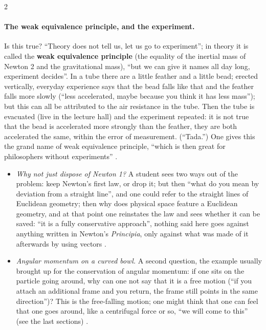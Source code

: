 \begin{paracol}{2}
\paragraph{The weak equivalence principle, and the experiment.} Is this true? ``Theory does not tell us, let us go to experiment''; in theory it is called the \textbf{weak equivalence principle} (the equality of the inertial mass of Newton 2 and the gravitational mass), ``but we can give it names all day long, experiment decides''. In a tube there are a little feather and a little bead; erected vertically, everyday experience says that the bead falls like that and the feather falls more slowly (``less accelerated, maybe because you think it has less mass''); but this can all be attributed to the air resistance in the tube. Then the tube is evacuated (live in the lecture hall) and the experiment repeated: it is not true that the bead is accelerated more strongly than the feather, they are both accelerated the same, within the error of measurement. (``Tada.'') One gives this the grand name of weak equivalence principle, ``which is then great for philosophers without experiments''
.

\begin{coursenote}
\begin{itemize}
  \item \emph{Why not just dispose of Newton 1?} A student sees two ways out of the problem: keep Newton's first law, or drop it; but then ``what do you mean by deviation from a straight line'', and one could refer to the straight lines of Euclidean geometry; then why does physical space feature a Euclidean geometry, and at that point one reinstates the law and sees whether it can be saved: ``it is a fully conservative approach'', nothing said here goes against anything written in Newton's \emph{Principia}, only against what was made of it afterwards by using vectors .
  \item \emph{Angular momentum on a curved bowl.} A second question, the example usually brought up for the conservation of angular momentum: if one sits on the particle going around, why can one not say that it is a free motion (``if you attach an additional frame and you return, the frame still points in the same direction'')? This is the free-falling motion; one might think that one can feel that one goes around, like a centrifugal force or so, ``we will come to this'' (see the last sections) .
\end{itemize}
\end{coursenote}


\end{paracol}
